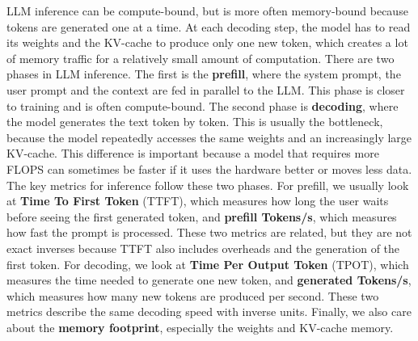 LLM inference can be compute-bound, but is more often memory-bound because tokens are generated one at a time.
At each decoding step, the model has to read its weights and the KV-cache to produce only one new token,
which creates a lot of memory traffic for a relatively small amount of computation.
There are two phases in LLM inference. The first is the \textbf{prefill}, where the system prompt,
the user prompt and the context are fed in parallel to the LLM. This phase is closer to training
and is often compute-bound. The second phase is \textbf{decoding}, where the model generates the text
token by token. This is usually the bottleneck, because the model repeatedly accesses the same weights
and an increasingly large KV-cache. This difference is important because a model that
requires more FLOPS can sometimes be faster if it uses the hardware better or moves less data.
The key metrics for inference follow these two phases. For prefill, we usually look at
\textbf{Time To First Token} (TTFT), which measures how long the user waits before seeing the first
generated token, and \textbf{prefill Tokens/s}, which measures how fast the prompt is processed.
These two metrics are related, but they are not exact inverses because TTFT also includes overheads
and the generation of the first token. For decoding, we look at \textbf{Time Per Output Token} (TPOT),
which measures the time needed to generate one new token, and \textbf{generated Tokens/s}, which
measures how many new tokens are produced per second. These two metrics describe the same decoding
speed with inverse units. Finally, we also care about the \textbf{memory footprint}, especially the
weights and KV-cache memory.

